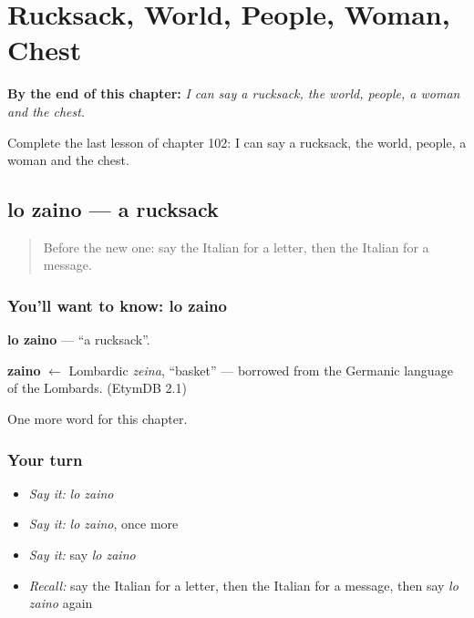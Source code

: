 
\chapter{Rucksack, World, People, Woman, Chest}
\label{ch:it-rucksack-world-people-woman-chest}

\begin{chapteropening}
\textbf{By the end of this chapter:} \emph{I can say a rucksack, the world, people, a woman and the chest.}

Complete the last lesson of chapter 102: I can say a rucksack, the world, people, a woman and the chest.
\end{chapteropening}

\section[lo zaino]{lo zaino — a rucksack}

\label{lesson:IT-C102-zaino}



\begin{quote}
Before the new one: say the Italian for a letter, then the Italian for a message.
\end{quote}

\subsection*{You'll want to know: lo zaino}
\textbf{lo zaino} — \textquotedblleft{}a rucksack\textquotedblright{}.

\begin{cousinweb}
\textbf{zaino} $\leftarrow$ Lombardic \emph{zeina}, \textquotedblleft{}basket\textquotedblright{} — borrowed from the Germanic language of the Lombards. (EtymDB 2.1)
\end{cousinweb}

\begin{grammarlens}[title={What you've built}]
One more word for this chapter.
\end{grammarlens}

\subsection*{Your turn}
\begin{itemize}
\raggedright
  \item \emph{Say it:} \emph{lo zaino}
  \item \emph{Say it:} \emph{lo zaino}, once more
  \item \emph{Say it:} say \emph{lo zaino}
  \item \emph{Recall:} say the Italian for a letter, then the Italian for a message, then say \emph{lo zaino} again
\end{itemize}

